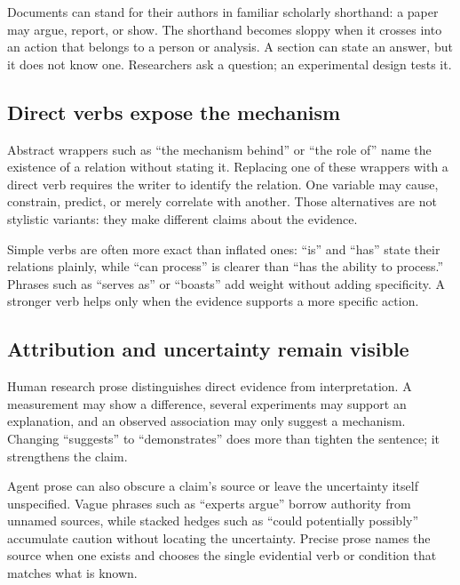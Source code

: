 Documents can stand for their authors in familiar scholarly shorthand: a paper
may argue, report, or show. The shorthand becomes sloppy when it crosses into
an action that belongs to a person or analysis. A section can state an answer,
but it does not know one. Researchers ask a question; an experimental design
tests it.

\subsection{Direct verbs expose the mechanism}

Abstract wrappers such as ``the mechanism behind'' or ``the role of'' name the
existence of a relation without stating it. Replacing one of these wrappers
with a direct verb requires the writer to identify the relation. One variable
may cause, constrain, predict, or merely correlate with another. Those
alternatives are not stylistic variants: they make different claims about the
evidence.

Simple verbs are often more exact than inflated ones: ``is'' and ``has'' state
their relations plainly, while ``can process'' is clearer than ``has the
ability to process.'' Phrases such as ``serves as'' or ``boasts'' add weight
without adding specificity. A stronger verb helps only when the evidence
supports a more specific action.

\subsection{Attribution and uncertainty remain visible}

Human research prose distinguishes direct evidence from interpretation. A
measurement may show a difference, several experiments may support an
explanation, and an observed association may only suggest a mechanism.
Changing ``suggests'' to ``demonstrates'' does more than tighten the sentence;
it strengthens the claim.

Agent prose can also obscure a claim's source or leave the uncertainty itself
unspecified. Vague phrases such as ``experts argue'' borrow authority from
unnamed sources, while stacked hedges such as ``could potentially possibly''
accumulate caution without locating the uncertainty. Precise prose names the
source when one exists and chooses the single evidential verb or condition
that matches what is known.
